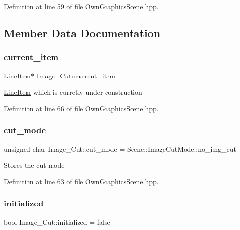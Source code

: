 Definition at line 59 of file Own\+Graphics\+Scene.\+hpp.



\subsection{Member Data Documentation}
\mbox{\label{structImage__Cut_aa3fcac1ab311c38947b343d8913fb2e8}} 
\subsubsection{\texorpdfstring{current\+\_\+item}{current\_item}}
{\footnotesize\ttfamily \mbox{\hyperlink{classLineItem}{Line\+Item}}$\ast$ Image\+\_\+\+Cut\+::current\+\_\+item}

\mbox{\hyperlink{classLineItem}{Line\+Item}} which is curretly under construction 

Definition at line 66 of file Own\+Graphics\+Scene.\+hpp.

\mbox{\label{structImage__Cut_ad4904a8753086961301a91050f6b2794}} 
\subsubsection{\texorpdfstring{cut\+\_\+mode}{cut\_mode}}
{\footnotesize\ttfamily unsigned char Image\+\_\+\+Cut\+::cut\+\_\+mode = Scene\+::\+Image\+Cut\+Mode\+::no\+\_\+img\+\_\+cut}

Stores the cut mode 

Definition at line 63 of file Own\+Graphics\+Scene.\+hpp.

\mbox{\label{structImage__Cut_a7259136300a6eade3ee84743f3e47c1f}} 
\subsubsection{\texorpdfstring{initialized}{initialized}}
{\footnotesize\ttfamily bool Image\+\_\+\+Cut\+::initialized = false}

